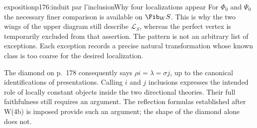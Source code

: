 \begin{dcomment}{exposition}{p176:induit par l'inclusion}{Why four localizations appear}
For $\Phi_0$ and $\Psi_0$ the necessary finer comparison is available on $\Fib_W S$. This is why the two wings of the upper diagram still describe $\mathcal L_S$, whereas the perfect vertex is temporarily excluded from that assertion. The pattern is not an arbitrary list of exceptions. Each exception records a precise natural transformation whose known class is too coarse for the desired localization.

The diamond on p.~178 consequently says $\rho i=\lambda=\sigma j$, up to the canonical identifications of presentations. Calling $i$ and $j$ inclusions expresses the intended role of locally constant objects inside the two directional theories. Their full faithfulness still requires an argument. The reflection formulas established after W(4b) is imposed provide such an argument; the shape of the diamond alone does not.
\end{dcomment}


